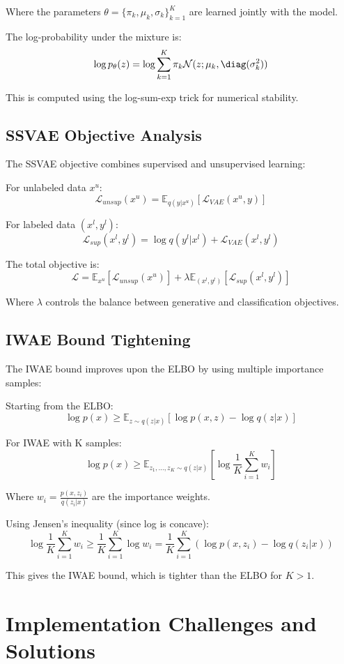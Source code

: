 \documentclass{article}
\begin{document}
Where the parameters $\theta = \{\pi_k, \mu_k, \sigma_k\}_{k=1}^K$ are learned jointly with the model.

The log-probability under the mixture is:
\[
\log p_\theta(z) = \log \sum_{k=1}^K \pi_k \mathcal{N}(z; \mu_k, \diag(\sigma_k^2))
\]

This is computed using the log-sum-exp trick for numerical stability.

\subsection{SSVAE Objective Analysis}

The SSVAE objective combines supervised and unsupervised learning:

For unlabeled data $x^u$:
\[
\mathcal{L}_{unsup}(x^u) = \mathbb{E}_{q(y|x^u)} [\mathcal{L}_{VAE}(x^u, y)]
\]

For labeled data $(x^l, y^l)$:
\[
\mathcal{L}_{sup}(x^l, y^l) = \log q(y^l|x^l) + \mathcal{L}_{VAE}(x^l, y^l)
\]

The total objective is:
\[
\mathcal{L} = \mathbb{E}_{x^u} [\mathcal{L}_{unsup}(x^u)] + \lambda \mathbb{E}_{(x^l,y^l)} [\mathcal{L}_{sup}(x^l, y^l)]
\]

Where $\lambda$ controls the balance between generative and classification objectives.

\subsection{IWAE Bound Tightening}

The IWAE bound improves upon the ELBO by using multiple importance samples:

Starting from the ELBO:
\[
\log p(x) \geq \mathbb{E}_{z \sim q(z|x)} [\log p(x,z) - \log q(z|x)]
\]

For IWAE with K samples:
\[
\log p(x) \geq \mathbb{E}_{z_1,\dots,z_K \sim q(z|x)} \left[ \log \frac{1}{K} \sum_{i=1}^K w_i \right]
\]

Where $w_i = \frac{p(x,z_i)}{q(z_i|x)}$ are the importance weights.

Using Jensen's inequality (since log is concave):
\[
\log \frac{1}{K} \sum_{i=1}^K w_i \geq \frac{1}{K} \sum_{i=1}^K \log w_i = \frac{1}{K} \sum_{i=1}^K (\log p(x,z_i) - \log q(z_i|x))
\]

This gives the IWAE bound, which is tighter than the ELBO for $K > 1$.

\section{Implementation Challenges and Solutions}
\end{document}
